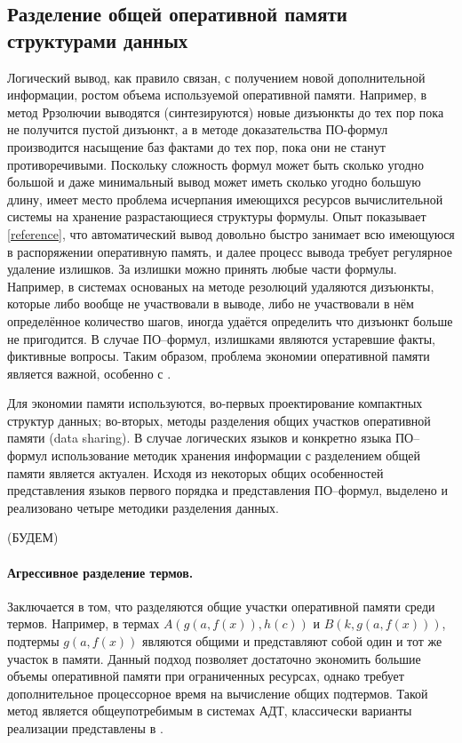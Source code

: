 \subsection{Разделение общей оперативной памяти структурами данных}
Логический вывод, как правило связан, с получением новой дополнительной информации, ростом объема используемой оперативной памяти. Например, в метод Ррзолючии выводятся (синтезируются) новые дизъюнкты до тех пор пока не получится пустой дизъюнкт, а в методе доказательства ПО-формул производится насыщение баз фактами до тех пор, пока они не станут противоречивыми. Поскольку сложность формул может быть сколько угодно большой и даже минимальный вывод может иметь сколько угодно большую длину, имеет место проблема исчерпания имеющихся ресурсов вычислительной системы на хранение разрастающиеся структуры формулы. Опыт показывает \ref{reference}, что автоматический вывод довольно быстро занимает всю имеющуюся в распоряжении оперативную память, и далее процесс вывода требует регулярное удаление излишков. За излишки можно принять любые части формулы. Например, в системах основаных на методе резолюций удаляются дизъюнкты, которые либо вообще не участвовали в выводе, либо не участвовали в нём определённое количество шагов, иногда удаётся определить что дизъюнкт больше не пригодится. В случае ПО--формул, излишками являются устаревшие факты, фиктивные вопросы. Таким образом, проблема экономии оперативной памяти является важной, особенно с .

Для экономии памяти используются, во-первых проектирование компактных структур данных; во-вторых, методы разделения общих участков оперативной памяти (data sharing). В случае логических языков и конкретно языка ПО--формул использование методик хранения информации с разделением общей памяти является актуален. Исходя из некоторых общих особенностей представления языков первого порядка и представления ПО--формул, выделено и реализовано четыре методики разделения данных.

 (БУДЕМ)

\paragraph{Агрессивное разделение термов.} Заключается в том, что разделяются общие участки оперативной памяти среди термов. Например, в термах $A(g(a,f(x)),h(c))$ и $B(k,g(a,f(x)))$, подтермы $g(a,f(x))$ являются общими и представляют собой один и тот же участок в памяти. Данный подход позволяет достаточно экономить большие объемы оперативной памяти при ограниченных ресурсах, однако требует дополнительное процессорное время на вычисление общих подтермов. Такой метод является общеупотребимым в системах АДТ, классически варианты реализации представлены в \cite{}.

